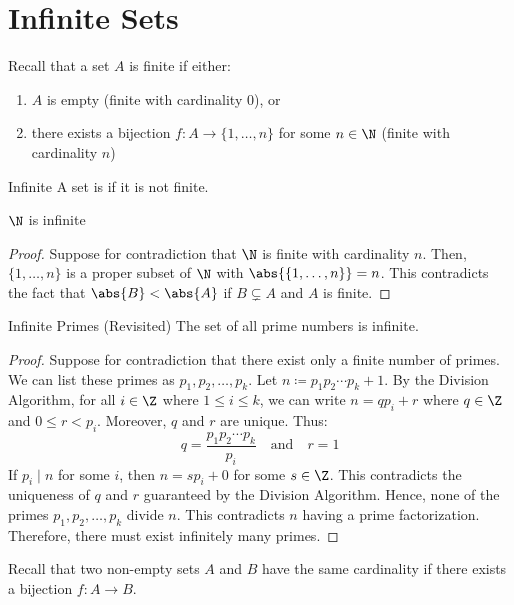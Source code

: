 \documentclass[letterpaper,12pt]{report}
\begin{document}
\section{Infinite Sets}
Recall that a set $A$ is finite if either:
\begin{enumerate}
    \item $A$ is empty (finite with cardinality $0$), or
    \item there exists a bijection $f : A \to \{1, \ldots, n\}$ for some $n \in \N$ (finite with cardinality $n$)
\end{enumerate}

\begin{dfnbox}{Infinite}{}
    A set is  if it is not finite.
\end{dfnbox}

\begin{exbox}{$\N$ is infinite}{}
    \begin{proof}
        Suppose for contradiction that $\N$ is finite with cardinality $n$.
        Then, $\{ 1, \ldots, n\}$ is a proper subset of $\N$ with $\abs{\{1, \ldots, n\}} = n$. This contradicts the fact that $\abs{B} < \abs{A}$ if $B \subsetneq A$ and $A$ is finite.
    \end{proof}
\end{exbox}

\begin{exbox}{Infinite Primes (Revisited)}{}
    The set of all prime numbers is infinite.
    \tcblower
    \begin{proof}
        Suppose for contradiction that there exist only a finite number of primes. We can list these primes as $p_1, p_2, \ldots, p_k$. Let $n \coloneq p_1 p_2 \cdots p_k + 1$. By the Division Algorithm, for all $i \in \Z$ where $1 \leq i \leq k$, we can write $n = qp_i + r$ where $q \in \Z$ and $0 \leq r < p_i$. Moreover, $q$ and $r$ are unique. Thus:
        \[ q = \frac{p_1 p_2 \cdots p_k}{p_i} \quad \text{and} \quad r = 1 \]
        If $p_i \mid n$ for some $i$, then $n = sp_i + 0$ for some $s \in \Z$. This contradicts the uniqueness of $q$ and $r$ guaranteed by the Division Algorithm. Hence, none of the primes $p_1, p_2, \ldots, p_k$ divide $n$. This contradicts $n$ having a prime factorization. Therefore, there must exist infinitely many primes.
    \end{proof}
\end{exbox}

Recall that two non-empty sets $A$ and $B$ have the same cardinality if there exists a bijection $f : A \to B$.
\end{document}
